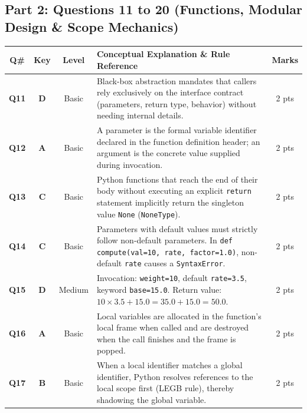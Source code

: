 \documentclass[11pt,a4paper]{article}
\begin{document}
\newpage

\subsection*{Part 2: Questions 11 to 20 (Functions, Modular Design \& Scope Mechanics)}

\begin{center}
\renewcommand{\arraystretch}{1.10}
\setlength{\tabcolsep}{3.5pt}
\begin{tabularx}{\textwidth}{|c|c|c|X|c|}
\hline
\textbf{Q\#} & \textbf{Key} & \textbf{Level} & \textbf{Conceptual Explanation \& Rule Reference} & \textbf{Marks} \\
\hline
\textbf{Q11} & \textbf{D} & Basic & Black-box abstraction mandates that callers rely exclusively on the interface contract (parameters, return type, behavior) without needing internal details. & 2 pts \\
\hline
\textbf{Q12} & \textbf{A} & Basic & A parameter is the formal variable identifier declared in the function definition header; an argument is the concrete value supplied during invocation. & 2 pts \\
\hline
\textbf{Q13} & \textbf{C} & Basic & Python functions that reach the end of their body without executing an explicit \texttt{return} statement implicitly return the singleton value \texttt{None} (\texttt{NoneType}). & 2 pts \\
\hline
\textbf{Q14} & \textbf{C} & Basic & Parameters with default values must strictly follow non-default parameters. In \texttt{def compute(val=10, rate, factor=1.0)}, non-default \texttt{rate} causes a \texttt{SyntaxError}. & 2 pts \\
\hline
\textbf{Q15} & \textbf{D} & Medium & Invocation: \texttt{weight=10}, default \texttt{rate=3.5}, keyword \texttt{base=15.0}. Return value: $10 \times 3.5 + 15.0 = 35.0 + 15.0 = 50.0$. & 2 pts \\
\hline
\textbf{Q16} & \textbf{A} & Basic & Local variables are allocated in the function's local frame when called and are destroyed when the call finishes and the frame is popped. & 2 pts \\
\hline
\textbf{Q17} & \textbf{B} & Basic & When a local identifier matches a global identifier, Python resolves references to the local scope first (LEGB rule), thereby shadowing the global variable. & 2 pts \\

\end{tabularx}
\end{center}
\end{document}
